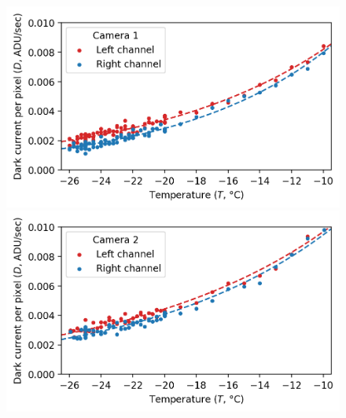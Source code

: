 \begin{colsection}
\begin{colsection}
\begin{figure}[p]
    \begin{center}
        \begin{minipage}[t]{0.49\textwidth}\vspace{10pt}
            \includegraphics[width=\linewidth]{images/detectors/dc_1.png}
        \end{minipage}
        \begin{minipage}[t]{0.49\textwidth}\vspace{10pt}
            \includegraphics[width=\linewidth]{images/detectors/dc_2.png}
        \end{minipage}


\end{center}
\end{figure}
\end{colsection}
\end{colsection}
